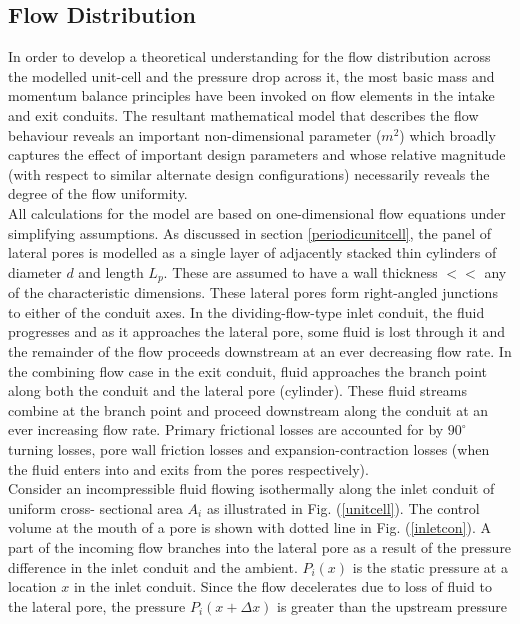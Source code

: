 \documentclass[twocolumn,10pt,cleanfoot]{ihmtc}
\begin{document}
\subsection{Flow Distribution}\label{BMmodel}
In order to develop a theoretical understanding for the flow distribution
across the modelled unit-cell and the pressure drop across it, the most
basic mass and momentum balance principles have been invoked on flow
elements in the intake and exit conduits. The resultant mathematical
model that describes the flow behaviour reveals an important non-dimensional
parameter ($m^2$) which broadly captures the effect of important
design parameters and whose relative magnitude (with respect to similar
alternate design configurations) necessarily reveals the degree of
the flow uniformity.\\
%
%
All calculations for the model are based on one-dimensional flow equations
under simplifying assumptions. As discussed in section \ref{periodicunitcell}, the panel of lateral pores is modelled
as a single layer of adjacently stacked thin cylinders of diameter
$d$ and length $L_p$. These are assumed to have a wall thickness
$<<$ any of the characteristic dimensions. These lateral
pores form right-angled junctions to either of the conduit
axes. In the dividing-flow-type inlet conduit, the fluid progresses
and as it approaches the lateral pore, some fluid is lost through
it and the remainder of the flow proceeds downstream at an ever decreasing
flow rate. In the combining flow case in the exit conduit, fluid approaches
the branch point along both the conduit and the lateral pore (cylinder).
These fluid streams combine at the branch point and proceed downstream along the conduit at an ever increasing flow rate. Primary
frictional losses are accounted for by $90^{\circ}$ turning losses,
pore wall friction losses and expansion-contraction losses (when the fluid enters into and exits from the pores respectively). \\
%
%
Consider an incompressible fluid flowing isothermally along the inlet
conduit of uniform cross- sectional area $A_i$ as illustrated in
Fig. (\ref{unitcell}). The control volume at the mouth of a pore is shown with dotted line in Fig. (\ref{inletcon}). A part of
the incoming flow branches into the lateral pore as a result of the
pressure difference in the inlet conduit and the ambient. $P_i(x)$
is the static pressure at a location $x$ in the inlet conduit. Since
the flow decelerates due to loss of fluid to the lateral pore, the
pressure $P_i(x+\Delta x)$ is greater than the upstream pressure
\end{document}
